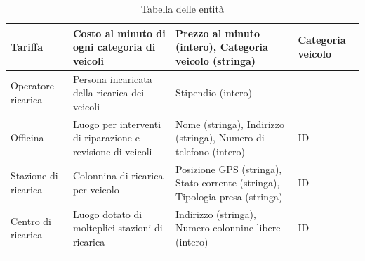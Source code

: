 \documentclass{article}
\begin{document}
\begin{longtable}[H]{|p{2.5cm}|p{4.8cm}|p{4.8cm}|p{2.3cm}|}
Tariffa & Costo al minuto di ogni categoria di veicoli & Prezzo al minuto (intero), Categoria veicolo (stringa) & Categoria veicolo \\ \hline
Operatore ricarica & Persona incaricata della ricarica dei veicoli & Stipendio (intero) &  \\ \hline
Officina & Luogo per interventi di riparazione e revisione di veicoli & Nome (stringa), Indirizzo (stringa), Numero di telefono (intero) & ID \\ \hline
Stazione di ricarica & Colonnina di ricarica per veicolo & Posizione GPS (stringa), Stato corrente (stringa), Tipologia presa (stringa) & ID \\ \hline
Centro di ricarica & Luogo dotato di molteplici stazioni di ricarica & Indirizzo (stringa), Numero colonnine libere (intero) & ID \\ \hline
\caption{Tabella delle entità}
\label{table_glossario_termini}
\end{longtable}
\end{document}
